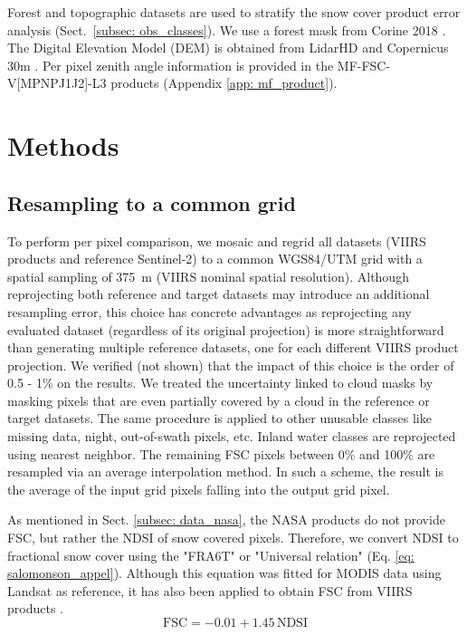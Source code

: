 \documentclass[tc, manuscript]{copernicus}
\begin{document}
Forest and topographic datasets are used to stratify the snow cover product error analysis (Sect.~\ref{subsec: obs_classes}). We use a forest mask from Corine 2018 \citep{corine2018}. The Digital Elevation Model (DEM) is obtained from LidarHD \citep{lidarhd} and Copernicus 30m \citep{copernicus_dem}. Per pixel zenith angle information is provided in the MF-FSC-V[MP\textbar NP\textbar J1\textbar J2]-L3 products (Appendix \ref{app: mf_product}). 

\section{Methods}
\label{sec: methods}

\subsection{Resampling to a common grid}
\label{subsec: meth_resampling} 

To perform per pixel comparison, we mosaic and regrid all datasets (VIIRS products and reference Sentinel-2) to a common WGS84/UTM grid with a spatial sampling of 375~m (VIIRS nominal spatial resolution). Although reprojecting both reference and target datasets may introduce an additional resampling error, this choice has concrete advantages as reprojecting any evaluated dataset (regardless of its original projection) is more straightforward than generating multiple reference datasets, one for each different VIIRS product projection. We verified (not shown) that the impact of this choice is the order of 0.5 - 1\% on the results. We treated the uncertainty linked to cloud masks by masking pixels that are even partially covered by a cloud in the reference or target datasets. The same procedure is applied to other unusable classes like missing data, night, out-of-swath pixels, etc. Inland water classes are reprojected using nearest neighbor. The remaining FSC pixels between 0\% and 100\% are resampled via an average interpolation method. In such a scheme, the result is the average of the input grid pixels falling into the output grid pixel.

As mentioned in Sect. \ref{subsec: data_nasa}, the NASA products do not provide FSC, but rather the NDSI of snow covered pixels. Therefore, we convert NDSI to fractional snow cover using the "FRA6T" or "Universal relation" (Eq. \ref{eq: salomonson_appel}). Although this equation was fitted for MODIS data using Landsat as reference, it has also been applied to obtain FSC from VIIRS products \citep{stillinger_landsat_2023, jacques-hamilton_measurement_2025}.
\begin{equation}
    \mathrm{FSC} = -0.01 + 1.45 \, \mathrm{NDSI}
    \label{eq: salomonson_appel}
\end{equation}
\end{document}
